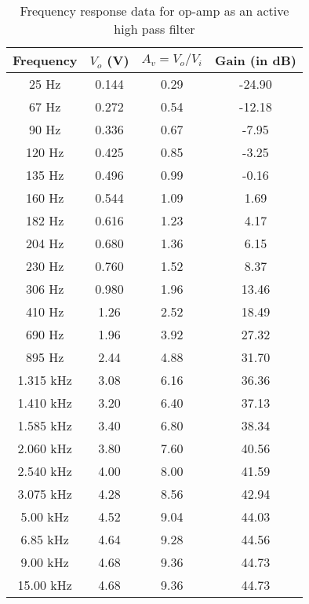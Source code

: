 \begin{table}[H]
    \centering
    \begin{tabular}{|c|c|c|c|} \hline
        Frequency & $V_o$ (V) & $A_v = V_o/V_i$ & Gain (in dB) \\ \hline
        25 Hz    & 0.144 & 0.29 & -24.90 \\
        67 Hz    & 0.272 & 0.54 & -12.18 \\
        90 Hz    & 0.336 & 0.67 &  -7.95 \\
        120 Hz   & 0.425 & 0.85 &  -3.25 \\
        135 Hz   & 0.496 & 0.99 &  -0.16 \\
        160 Hz   & 0.544 & 1.09 &   1.69 \\
        182 Hz   & 0.616 & 1.23 &   4.17 \\
        204 Hz   & 0.680 & 1.36 &   6.15 \\
        230 Hz   & 0.760 & 1.52 &   8.37 \\
        306 Hz   & 0.980 & 1.96 &  13.46 \\
        410 Hz   & 1.26  & 2.52 &  18.49 \\
        690 Hz   & 1.96  & 3.92 &  27.32 \\
        895 Hz   & 2.44  & 4.88 &  31.70 \\
        1.315 kHz  & 3.08  & 6.16 &  36.36 \\
        1.410 kHz  & 3.20   & 6.40 &  37.13 \\
        1.585 kHz  & 3.40  & 6.80  &  38.34 \\
        2.060 kHz  & 3.80   & 7.60 &  40.56 \\
        2.540 kHz  & 4.00    & 8.00  &  41.59 \\
        3.075 kHz  & 4.28  & 8.56 &  42.94 \\
        5.00 kHz  & 4.52  & 9.04 &  44.03 \\
        6.85 kHz  & 4.64  & 9.28 &  44.56 \\
        9.00 kHz  & 4.68  & 9.36 &  44.73 \\
        15.00 kHz & 4.68  & 9.36 &  44.73 \\
        \hline
        \end{tabular}    
        \caption{Frequency response data for op-amp as an active high pass filter}
        \label{tab:2}
\end{table}